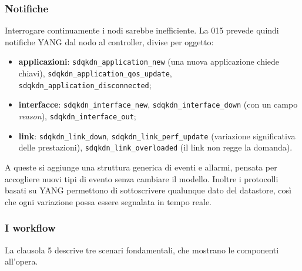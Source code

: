 \subsubsection{Notifiche}

Interrogare continuamente i nodi sarebbe inefficiente. La 015 prevede
quindi notifiche YANG dal nodo al controller, divise per oggetto:
\begin{itemize}
  \item \textbf{applicazioni}: \texttt{sdqkdn\_application\_new} (una nuova
        applicazione chiede chiavi), \texttt{sdqkdn\_application\_qos\_update},
        \texttt{sdqkdn\_application\_disconnected};
  \item \textbf{interfacce}: \texttt{sdqkdn\_interface\_new},
        \texttt{sdqkdn\_interface\_down} (con un campo \emph{reason}),
        \texttt{sdqkdn\_interface\_out};
  \item \textbf{link}: \texttt{sdqkdn\_link\_down},
        \texttt{sdqkdn\_link\_perf\_update} (variazione significativa delle
        prestazioni), \texttt{sdqkdn\_link\_overloaded} (il link non regge
        la domanda).
\end{itemize}
A queste si aggiunge una struttura generica di eventi e allarmi, pensata
per accogliere nuovi tipi di evento senza cambiare il modello. Inoltre i
protocolli basati su YANG permettono di sottoscrivere qualunque dato del
datastore, così che ogni variazione possa essere segnalata in tempo reale.

\subsubsection{I workflow}

La clausola 5 descrive tre scenari fondamentali, che mostrano le componenti
all'opera.

